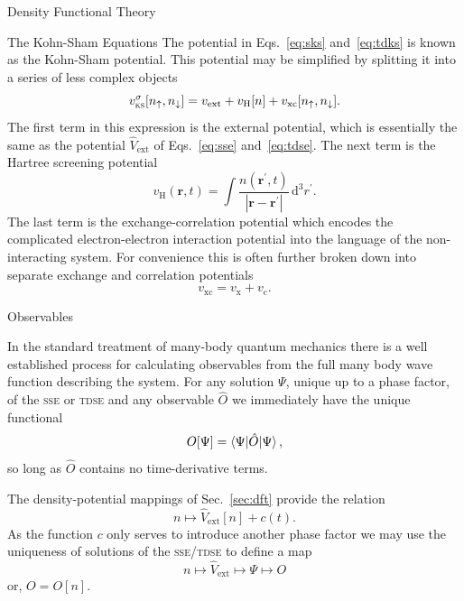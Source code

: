 \documentclass[letterpaper, 11 pt]{report}
\begin{document}
\begin{chapter}{Density Functional Theory \label{chap:dft}}
\begin{section}{The Kohn-Sham Equations \label{sec:ks}}
      The potential in Eqs.~\eqref{eq:sks} and~\eqref{eq:tdks} is known as the Kohn-Sham potential. This
      potential may be simplified by splitting it into a series of less complex objects
      \begin{equation} \label{eq:vks}
         v^\sigma_\mathrm{\textsc{ks}}[n_\uparrow, n_\downarrow] = v_\mathrm{ext} + v_\mathrm{H}[n]
            + v_\mathrm{xc}[n_\uparrow, n_\downarrow].
      \end{equation}
      The first term in this expression is the external potential, which is essentially the same as the
      potential $\hat{V}_\mathrm{ext}$ of Eqs.~\eqref{eq:sse} and~\eqref{eq:tdse}. The next term is
      the Hartree screening potential
      \begin{equation} \label{eq:vh}
         v_\mathrm{H}(\mathbf{r},t) = \int \frac{n(\mathbf{r}^\prime, t)}
            {\left| \mathbf{r} - \mathbf{r}^\prime\right|} \, \mathrm{d}^3 r^\prime.
      \end{equation}
      The last term is the exchange-correlation potential which encodes the complicated
      electron-electron interaction potential into the language of the non-interacting system. For
      convenience this is often further broken down into separate exchange and correlation potentials
      \begin{equation} \label{eq:vxc}
         v_\mathrm{xc} = v_\mathrm{x} + v_\mathrm{c}.
      \end{equation}

   \end{section}

   \begin{section}{Observables \label{sec:obs}}

      In the standard treatment of many-body quantum mechanics there is a well established process for
      calculating observables from the full many body wave function describing the system. For any
      solution $\Psi$, unique up to a phase factor, of the \textsc{sse} or \textsc{tdse} and any
      observable $\hat{O}$ we immediately have the unique functional
      \begin{equation} \label{eq:obsfunc1}
         O[\Psi] = \braket{\Psi| \hat{O} | \Psi},
      \end{equation}
      so long as $\hat{O}$ contains no time-derivative terms.

      The density-potential mappings of Sec.~\ref{sec:dft} provide the relation
      \begin{equation} \label{eq:denpot}
         n \mapsto \hat{V}_\mathrm{ext}[n] + c(t).
      \end{equation}
      As the function $c$ only serves to introduce another phase factor we may use the uniqueness of
      solutions of the \textsc{sse}/\textsc{tdse} to define a map
      \begin{equation} \label{eq:obsfunc2}
         n \mapsto \hat{V}_\mathrm{ext} \mapsto \Psi \mapsto O
      \end{equation}
      or, $O = O[n]$.


\end{section}
\end{chapter}
\end{document}
